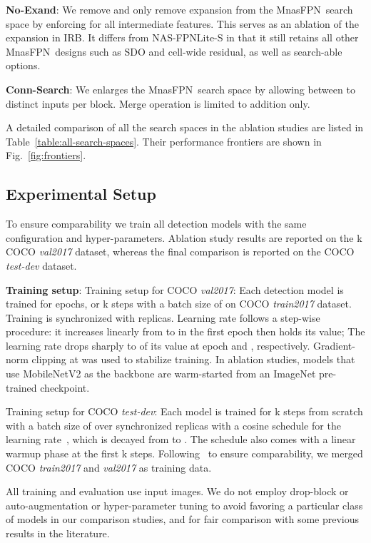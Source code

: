 \documentclass[10pt,twocolumn,letterpaper]{article}
\def\Mnasfpn{MnasFPN~}
\begin{document}
{\bf No-Exand}: We remove and only remove expansion from the \Mnasfpn search space by enforcing  for all intermediate features. This serves as an ablation of the expansion in IRB. It differs from NAS-FPNLite-S in that it still retains all other \Mnasfpn designs such as SDO and cell-wide residual, as well as search-able options.

{\bf Conn-Search}: We enlarges the \Mnasfpn search space by allowing between  to  distinct inputs per block. Merge operation is limited to addition only. 




A detailed comparison of all the search spaces in the ablation studies are listed in Table~\ref{table:all-search-spaces}. Their performance frontiers are shown in Fig.~\ref{fig:frontiers}.


\subsection{Experimental Setup}
\label{sec:exp_setup}
To ensure comparability we train all detection models with the same configuration and hyper-parameters. Ablation study results are reported on the k COCO {\it val2017} dataset, whereas the final comparison is reported on the COCO {\it test-dev} dataset. 

{\bf Training setup}:
Training setup for COCO {\it val2017}: Each detection model is trained for  epochs, or k steps with a batch size of  on COCO {\it train2017} dataset. Training is synchronized with  replicas. Learning rate follows a step-wise procedure: it increases linearly from  to  in the first epoch then holds its value; The learning rate drops sharply to  of its value at epoch  and , respectively. Gradient-norm clipping at  was used to stabilize training.
In ablation studies, models that use MobileNetV2 as the backbone are warm-started from an ImageNet pre-trained checkpoint.

Training setup for COCO {\it test-dev}: Each model is trained for k steps from scratch with a batch size of  over  synchronized replicas with a cosine schedule for the learning rate~\cite{loshchilov2016sgdr}, which is decayed from  to . The schedule also comes with a linear warmup phase at the first k steps. Following~\cite{sandler2018mobilenetv2, huang2017speed} to ensure comparability, we merged COCO {\it train2017} and {\it val2017} as training data.

All training and evaluation use  input images. We do not employ drop-block or auto-augmentation or hyper-parameter tuning to avoid favoring a particular class of models in our comparison studies, and for fair comparison with some previous results in the literature.
\end{document}

